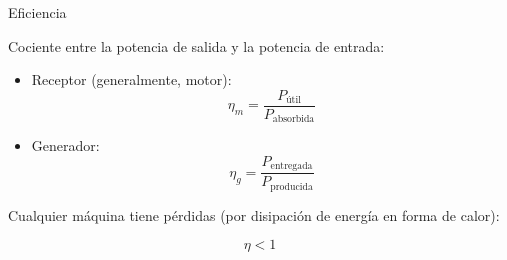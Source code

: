 \documentclass[aspectratio=169, xcolor={usenames,svgnames,dvipsnames}]{beamer}
\begin{document}
\begin{frame}{Eficiencia}
    
    Cociente entre la potencia de salida y la potencia de entrada:
    \begin{itemize}
        \item \alert{Receptor} (generalmente, motor):
    \begin{equation*}
      \eta_m = \frac{P_{\textrm{útil}}}{P_{\textrm{absorbida}}}
    \end{equation*}
    
    \item \alert{Generador}:
    \begin{equation*}
      \eta_g = \frac{P_{\textrm{entregada}}}{P_{\textrm{producida}}}
    \end{equation*}
    \end{itemize}

    \vspace{4mm}
    \alert{Cualquier máquina tiene pérdidas} (por disipación de energía en forma de calor):
    
    \begin{equation*}
      \boxed{\eta < 1}
    \end{equation*}
\end{frame}

\end{document}
